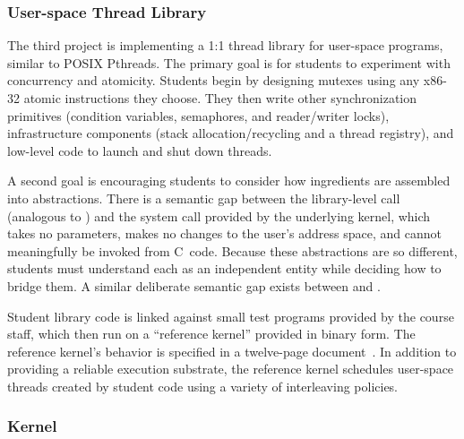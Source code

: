 \subsubsection{User-space Thread Library}

The third project is implementing a 1:1 thread library for
user-space programs,
similar to POSIX Pthreads.
The primary goal is
for students to experiment
with concurrency and atomicity.
Students begin by designing mutexes using any
x86-32 atomic instructions they choose.
They then write other synchronization
primitives (condition variables, semaphores,
and reader/writer locks), infrastructure
components (stack allocation/recycling and
a thread registry),
and low-level code to launch and shut down
threads.

A second goal is encouraging students to
consider how ingredients are assembled into
abstractions.
There is a semantic gap
between the library-level 
call (analogous to )
and the  system call provided
by the underlying kernel,
which takes no parameters,
makes no changes to the user's address space,
and cannot meaningfully
be invoked from C~code.
Because these abstractions are so different,
students must
understand each as an independent entity while
deciding how to bridge them.
A similar deliberate semantic gap exists between
 and .

Student library code is linked against small
test programs provided by the course staff,
which then run on a ``reference kernel'' provided in binary form.
The reference kernel's behavior is specified
in a twelve-page document~\cite{kspec}.
In addition to providing a reliable execution
substrate,
the reference kernel
schedules user-space threads created by
student code using a variety of
interleaving policies.

\subsubsection{\pebbles Kernel}

